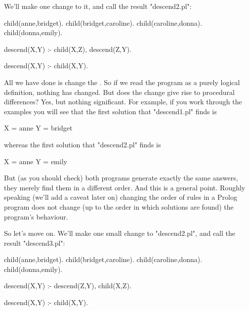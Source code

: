We'll make one change to it, and call the result "descend2.pl":
\begin{LPNcodedisplay}
child(anne,bridget).
child(bridget,caroline).
child(caroline,donna).
child(donna,emily).

descend(X,Y) :- child(X,Z),
                 descend(Z,Y).

descend(X,Y) :- child(X,Y).
\end{LPNcodedisplay}

All we have done is change the . So if we read the
program as a purely logical definition, nothing has changed.  But does
the change give rise to procedural differences?  Yes, but nothing
significant. For example, if you work through the examples you
will see that the first solution that "descend1.pl" finds is
\begin{LPNcodedisplay}
X = anne
Y = bridget
\end{LPNcodedisplay}
whereas the first solution that "descend2.pl" finds is
\begin{LPNcodedisplay}
X = anne
Y = emily
\end{LPNcodedisplay}
But (as you should check) both programs generate exactly the same
answers, they merely find them in a different order. And this is a
general point. Roughly speaking (we'll add a caveat later on) changing
the order of rules in a Prolog program does not change (up to the
order in which solutions are found) the program's behaviour.

So let's move on. We'll make one small change to "descend2.pl", and
call the result "descend3.pl":
\begin{LPNcodedisplay}
child(anne,bridget).
child(bridget,caroline).
child(caroline,donna).
child(donna,emily).

descend(X,Y) :- descend(Z,Y),
                 child(X,Z).

descend(X,Y) :- child(X,Y).
\end{LPNcodedisplay}

